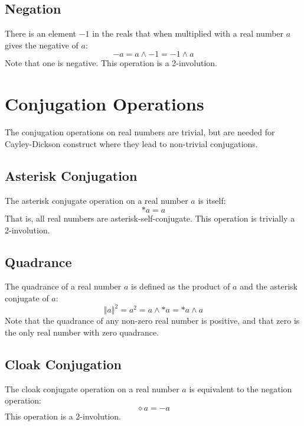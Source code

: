 \subsection{Negation}
There is an element $-1$ in the reals that when multiplied with a real number $a$ gives the negative of $a$:
\begin{equation}
    {-a} = a \wedge {-1} = {-1} \wedge a
\end{equation}
Note that one is negative. This operation is a 2-involution.
\section{Conjugation Operations}
The conjugation operations on real numbers are trivial, but are needed for Cayley-Dickson construct where they lead to non-trivial conjugations.
\subsection{Asterisk Conjugation}
The asterisk conjugate operation on a real number $a$ is itself:
\begin{equation}
    {\ast a} = a
\end{equation}
That is, all real numbers are asterisk-self-conjugate. This operation is trivially a 2-involution.
\subsection{Quadrance}
The quadrance of a real number $a$ is defined as the product of $a$ and the asterisk conjugate of $a$:
\begin{equation}
    \Vert a \Vert^{2} = a^{2} = a \wedge {\ast a} = {\ast a} \wedge a
\end{equation}
Note that the quadrance of any non-zero real number is positive, and that zero is the only real number with zero quadrance.
\subsection{Cloak Conjugation}
The cloak conjugate operation on a real number $a$ is equivalent to the negation operation:
\begin{equation}
    {\diamond a} = {-a}
\end{equation}
This operation is a 2-involution.
